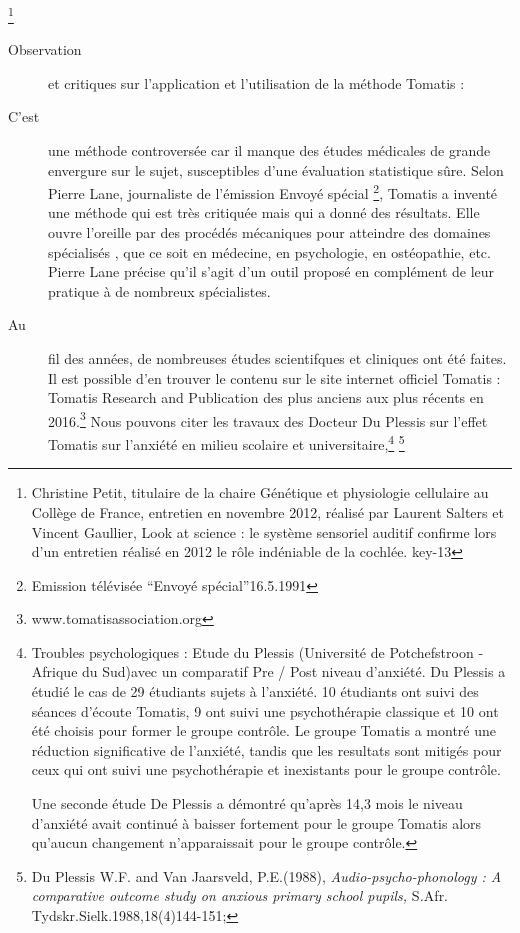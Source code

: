 \footnote{ Christine Petit, titulaire de la chaire Génétique et physiologie
cellulaire au Collège de France, entretien en novembre 2012, réalisé
par Laurent Salters et Vincent Gaullier, Look at science : le système
sensoriel auditif confirme lors d'un entretien réalisé en 2012 le
rôle indéniable de la cochlée. key-13}
\begin{description}
\item [{Observation}] et critiques sur l'application et l'utilisation de
la méthode Tomatis : 
\item [{C'est}] une méthode controversée car il manque des études médicales
de grande envergure sur le sujet, susceptibles d'une évaluation statistique
sûre. Selon Pierre Lane, journaliste de l'émission Envoyé spécial
\footnote{Emission télévisée ``Envoyé spécial''16.5.1991}, Tomatis
a inventé une méthode qui est très critiquée mais qui a donné des
résultats. Elle ouvre l'oreille par des procédés mécaniques pour atteindre
des domaines spécialisés , que ce soit en médecine, en psychologie,
en ostéopathie, etc. Pierre Lane précise qu'il s'agit d'un outil proposé
en complément de leur pratique à de nombreux spécialistes. 
\item [{Au}] fil des années, de nombreuses études scientifques et cliniques
ont été faites. Il est possible d'en trouver le contenu sur le site
internet officiel Tomatis : Tomatis Research and Publication des plus
anciens aux plus récents en 2016.\footnote{www.tomatisassociation.org}
Nous pouvons citer les travaux des Docteur Du Plessis sur l'effet
Tomatis sur l'anxiété en milieu scolaire et universitaire,\footnote{Troubles psychologiques : Etude du Plessis (Université de Potchefstroon
- Afrique du Sud)avec un comparatif Pre / Post niveau d\textquoteright anxiété.
Du Plessis a étudié le cas de 29 étudiants sujets à l\textquoteright anxiété.
10 étudiants ont suivi des séances d\textquoteright écoute Tomatis\textregistered ,
9 ont suivi une psychothérapie classique et 10 ont été choisis pour
former le groupe contrôle. Le groupe Tomatis\textregistered{} a montré
une réduction significative de l\textquoteright anxiété, tandis que
les resultats sont mitigés pour ceux qui ont suivi une psychothérapie
et inexistants pour le groupe contrôle.

Une seconde étude De Plessis a démontré qu\textquoteright après 14,3
mois le niveau d\textquoteright anxiété avait continué à baisser fortement
pour le groupe Tomatis\textregistered{} alors qu\textquoteright aucun
changement n\textquoteright apparaissait pour le groupe contrôle.} \footnote{Du Plessis W.F. and Van Jaarsveld, P.E.(1988), \emph{Audio-psycho-phonology
: A comparative outcome study on anxious primary school pupils, }S\emph{.}Afr.
Tydskr.Sielk.1988,18(4)144-151;

}
\end{description}
